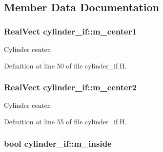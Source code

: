 \subsection{Member Data Documentation}
\subsubsection[{\texorpdfstring{m\+\_\+center1}{m_center1}}]{\setlength{\rightskip}{0pt plus 5cm}Real\+Vect cylinder\+\_\+if\+::m\+\_\+center1\hspace{0.3cm}{\ttfamily [protected]}}\hypertarget{classcylinder__if_a549a899cf87b38231c3ea1c9ea6e79a3}{}\label{classcylinder__if_a549a899cf87b38231c3ea1c9ea6e79a3}


Cylinder center. 



Definition at line 50 of file cylinder\+\_\+if.\+H.

\subsubsection[{\texorpdfstring{m\+\_\+center2}{m_center2}}]{\setlength{\rightskip}{0pt plus 5cm}Real\+Vect cylinder\+\_\+if\+::m\+\_\+center2\hspace{0.3cm}{\ttfamily [protected]}}\hypertarget{classcylinder__if_aae028d170f0ff412a5f6298390ea42fa}{}\label{classcylinder__if_aae028d170f0ff412a5f6298390ea42fa}


Cylinder center. 



Definition at line 55 of file cylinder\+\_\+if.\+H.

\subsubsection[{\texorpdfstring{m\+\_\+inside}{m_inside}}]{\setlength{\rightskip}{0pt plus 5cm}bool cylinder\+\_\+if\+::m\+\_\+inside\hspace{0.3cm}{\ttfamily [protected]}}\hypertarget{classcylinder__if_adcd9b3e418ea54b000cae4cc71d5cb43}{}\label{classcylinder__if_adcd9b3e418ea54b000cae4cc71d5cb43}


